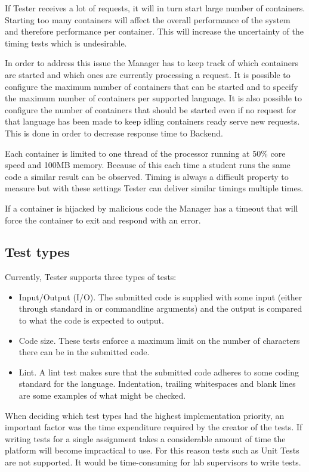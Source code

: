 If Tester receives a lot of requests, it will in turn start large number of containers.
Starting too many containers will affect the overall performance of the system and therefore performance per container.
This will increase the uncertainty of the timing tests which is undesirable.

In order to address this issue the Manager has to keep track of which containers
are started and which ones are currently processing a request. 
It is possible to configure the maximum number of containers that
can be started and to specify the maximum number of containers
per supported language. It is also possible to configure the number of containers
that should be started even if no request for that language has been made to keep
idling containers ready serve new requests. This is done in order to decrease
response time to Backend.

Each container is limited to one thread of the processor running at 50\% core speed and
100MB memory. Because of this each time a student runs the same code a similar
result can be observed. Timing is always a difficult property to measure but with
these settings Tester can deliver similar timings multiple times.

If a container is hijacked by malicious code the Manager has a timeout that will
force the container to exit and respond with an error.

\subsection{Test types}\label{sec:testtypes}
Currently, Tester supports three types of tests:
\begin{itemize}
\item Input/Output (I/O). The submitted code is supplied with some input (either through standard in or commandline arguments) and the output is compared to what the code is expected to output.
\item Code size. These tests enforce a maximum limit on the number of characters there can be in the submitted code.
\item Lint. A lint test makes sure that the submitted code adheres to some coding standard for the language. Indentation, trailing whitespaces and blank lines are some examples of what might be checked.
\end{itemize}
When deciding which test types had the highest implementation priority, an important factor was the time expenditure required by the creator of the tests. If writing tests for a single assignment takes a considerable amount of time the platform will become impractical to use. For this reason tests such as Unit Tests are not supported. It would be time-consuming for lab supervisors to write tests.


